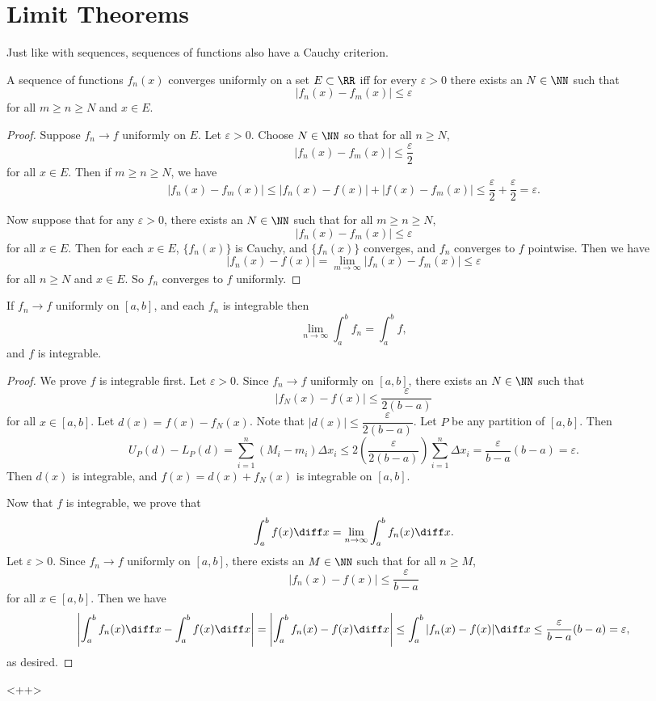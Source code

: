 \section{Limit Theorems}
Just like with sequences, sequences of functions also have a Cauchy criterion. 
\begin{theorem}
A sequence of functions $f_n(x)$ converges uniformly on a set $E \subset \RR$ iff for every $\varepsilon > 0$ there exists an $N \in \NN$ such that 
\[ |f_n(x) - f_m(x)| \leq \varepsilon \] for all $m \geq n \geq N$ and $x \in E$. 
\end{theorem}
\begin{proof}
Suppose $f_n \to f$ uniformly on $E$. Let $\varepsilon > 0$. Choose $N \in \NN$ so that for all $n \geq N$, 
\[ |f_n(x) - f_m(x)| \leq \dfrac{\varepsilon}{2} \] for all $x \in E$. Then if $m \geq n \geq N$, we have 
\[ |f_n(x) - f_m(x)| \leq |f_n(x) - f(x)| + |f(x) - f_m(x)| \leq \dfrac{\varepsilon}{2} + \dfrac{\varepsilon}{2} = \varepsilon. \] 

Now suppose that for any $\varepsilon > 0$, there exists an $N \in \NN$ such that for all $m \geq n \geq N$, 
\[ |f_n(x) - f_m(x)| \leq \varepsilon \] for all $x \in E$. Then for each $x \in E$, $\{f_n(x)\}$ is Cauchy, and $\{f_n(x)\}$ converges, and $f_n$ converges to $f$ pointwise. Then we have 
\[ |f_n(x) - f(x)| = \lim_{m \to \infty} | f_n(x) - f_m(x) | \leq \varepsilon \] for all $n \geq N$ and $x \in E$. So $f_n$ converges to $f$ uniformly. 
\end{proof}

\begin{theorem}
If $f_n \to f$ uniformly on $[a,b]$, and each $f_n$ is integrable then 
\[ \lim_{n\to \infty} \int_a^b f_n = \int_a^b f, \] and $f$ is integrable. 
\end{theorem}
\begin{proof}
We prove $f$ is integrable first. Let $\varepsilon > 0$. Since $f_n \to f$ uniformly on $[a,b]$, there exists an $N \in \NN$ such that 
\[ |f_N(x) - f(x)| \leq \dfrac{\varepsilon}{2(b-a)} \] for all $x \in [a,b]$. Let $d(x) = f(x) - f_N(x)$. Note that $|d(x)| \leq \dfrac{\varepsilon}{2(b-a)}$. Let $P$ be any partition of $[a,b]$. Then 
\[ U_P(d) - L_P(d) = \sum_{i=1}^n (M_i - m_i)\Delta x_i \leq 2 \left (\dfrac{\varepsilon}{2(b-a)} \right ) \sum_{i=1}^n \Delta x_i = \dfrac{\varepsilon}{b-a} (b-a) = \varepsilon. \] Then $d(x)$ is integrable, and $f(x) = d(x) + f_N(x)$ is integrable on $[a,b]$. 

Now that $f$ is integrable, we prove that 
\[ \int_a^b f(x) \diff x = \lim_{n \to \infty} \int_a^b f_n(x) \diff x. \]
Let $\varepsilon > 0$. Since $f_n \to f$ uniformly on $[a,b]$, there exists an $M \in \NN$ such that for all $n \geq M$, 
\[ |f_n(x) - f(x)| \leq \dfrac{\varepsilon}{b-a} \] for all $x \in [a,b]$. Then we have 
\[ \left | \int_a^b f_n(x) \diff x - \int_a^b f(x) \diff x \right | = \left |\int_a^b f_n(x) - f(x) \diff x \right | \leq \int_a^b |f_n(x) - f(x)| \diff x \leq \dfrac{\varepsilon}{b-a}(b-a) = \varepsilon, \] as desired. 
\end{proof}<++>
